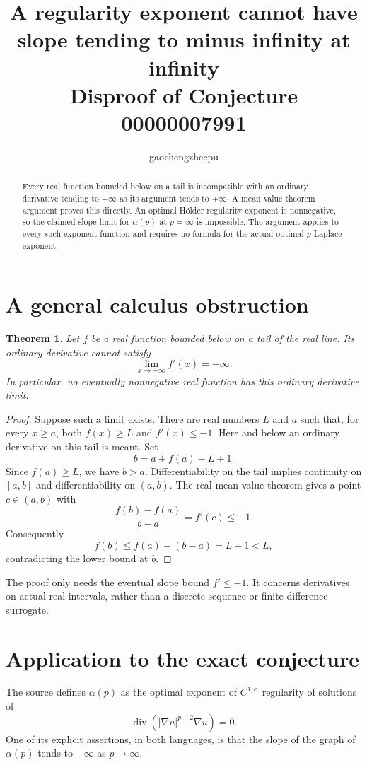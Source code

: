 \documentclass[11pt]{article}
\title{A regularity exponent cannot have slope tending to\newline
minus infinity at infinity\\\large Disproof of Conjecture 00000007991}
\author{gaochengzhecpu}\date{}
\newtheorem{theorem}{Theorem}
\begin{document}
\maketitle
\begin{abstract}
Every real function bounded below on a tail is incompatible with an
ordinary derivative tending to $-\infty$ as its argument tends to
$+\infty$. A mean value theorem argument proves this directly.
An optimal H\"older regularity exponent is nonnegative, so the
claimed slope limit for $\alpha(p)$ at $p=\infty$ is impossible.
The argument applies to every such exponent function and requires
no formula for the actual optimal $p$-Laplace exponent.
\end{abstract}

\section*{A general calculus obstruction}
\begin{theorem}
Let $f$ be a real function bounded below on a tail of the real line.
Its ordinary derivative cannot satisfy
\[
             \lim_{x\to+\infty} f'(x)=-\infty.
\]
In particular, no eventually nonnegative real function has this
ordinary derivative limit.
\end{theorem}
\begin{proof}
Suppose such a limit exists. There are real numbers $L$ and $a$ such
that, for every $x\geq a$, both $f(x)\geq L$ and $f'(x)\leq-1$.
Here and below an ordinary derivative on this tail is meant.
Set
\[
                 b=a+f(a)-L+1.
\]
Since $f(a)\geq L$, we have $b>a$. Differentiability on the tail
implies continuity on $[a,b]$ and differentiability on $(a,b)$.
The real mean value theorem gives a point $c\in(a,b)$ with
\[
 \frac{f(b)-f(a)}{b-a}=f'(c)\leq-1.
\]
Consequently
\[
 f(b)\leq f(a)-(b-a)=L-1<L,
\]
contradicting the lower bound at $b$.
\end{proof}

The proof only needs the eventual slope bound $f'\leq-1$.
It concerns derivatives on actual real intervals, rather than a
discrete sequence or finite-difference surrogate.

\newpage
\section*{Application to the exact conjecture}
The source defines $\alpha(p)$ as the optimal exponent of
$C^{1,\alpha}$ regularity of solutions of
\[
            \operatorname{div}(|\nabla u|^{p-2}\nabla u)=0.
\]
One of its explicit assertions, in both languages, is that the
slope of the graph of $\alpha(p)$ tends to $-\infty$ as
$p\to\infty$.
\end{document}
